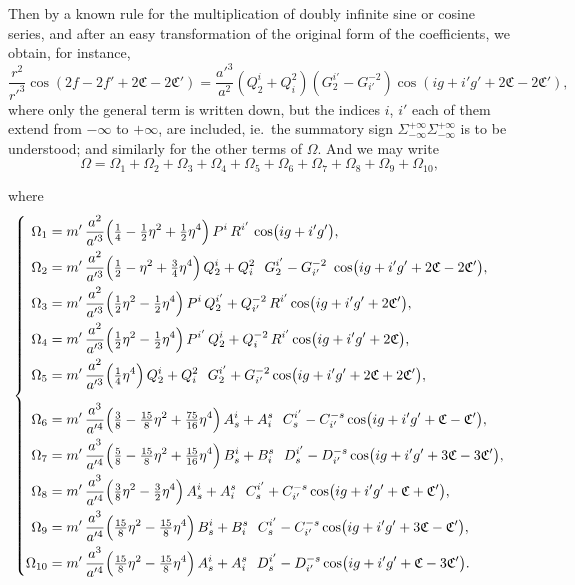 \documentclass[11pt]{article}
\begin{document}
\medskip
\noindent Then by a known rule for the multiplication of doubly infinite sine or cosine series, and after an easy transformation of the original form of the coefficients, we obtain, for instance,
\[
\frac{r^{2}}{r'^{3}}\cos(2f-2f'+2\mathfrak{C}-2\mathfrak{C}') = \frac{a'^{3}}{a^{2}}(Q_{2}^{i}+Q_{i}^{2})(G_{2}^{i'}-G_{i'}^{-2})\cos(ig+i'g'+2\mathfrak{C}-2\mathfrak{C}'),
\]
where only the general term is written down, but the indices $i$, $i'$ each of them extend from $-\infty$ to $+\infty$, are included, ie.\ the summatory sign $\Sigma_{-\infty}^{+\infty}\Sigma_{-\infty}^{+\infty}$ is to be understood; and similarly for the other terms of $\Omega$. And we may write
\[
\Omega = \Omega_{1} + \Omega_{2} + \Omega_{3} + \Omega_{4} + \Omega_{5} + \Omega_{6} + \Omega_{7} + \Omega_{8} + \Omega_{9} + \Omega_{10},
\]

\bigskip
{} where
\[
\left\{
\begin{aligned}
\Omega_{1} &= m'\,\frac{a^{2}}{a'^{3}}\Bigl(\tfrac{1}{4}-\tfrac{1}{2}\eta^{2}+\tfrac{1}{2}\eta^{4}\Bigr)\,P^{i}\,R^{i'}\,\cos\bigl(ig+i'g'\bigr),\\
\Omega_{2} &= m'\,\frac{a^{2}}{a'^{3}}\Bigl(\tfrac{1}{2}-\eta^{2}+\tfrac{3}{4}\eta^{4}\Bigr)\,Q_{2}^{i}+Q_{i}^{2}\ \ G_{2}^{i'}-G_{i'}^{-2}\ \cos\bigl(ig+i'g'+2\mathfrak{C}-2\mathfrak{C}'\bigr),\\
\Omega_{3} &= m'\,\frac{a^{2}}{a'^{3}}\Bigl(\tfrac{1}{2}\eta^{2}-\tfrac{1}{2}\eta^{4}\Bigr)\,P^{i}\,Q_{2}^{i'}+Q_{i'}^{-2}\,R^{i'}\cos\bigl(ig+i'g'+2\mathfrak{C}'\bigr),\\
\Omega_{4} &= m'\,\frac{a^{2}}{a'^{3}}\Bigl(\tfrac{1}{2}\eta^{2}-\tfrac{1}{2}\eta^{4}\Bigr)\,P^{i'}\,Q_{2}^{i}+Q_{i}^{-2}\,R^{i'}\cos\bigl(ig+i'g'+2\mathfrak{C}\bigr),\\
\Omega_{5} &= m'\,\frac{a^{2}}{a'^{3}}\Bigl(\tfrac{1}{4}\eta^{4}\Bigr)\,Q_{2}^{i}+Q_{i}^{2}\ \ G_{2}^{i'}+G_{i'}^{-2}\cos\bigl(ig+i'g'+2\mathfrak{C}+2\mathfrak{C}'\bigr),\\[6pt]
\Omega_{6} &= m'\,\frac{a^{3}}{a'^{4}}\Bigl(\tfrac{3}{8}-\tfrac{15}{8}\eta^{2}+\tfrac{75}{16}\eta^{4}\Bigr)\,A_{s}^{i}+A_{i}^{s}\ \ C_{s}^{i'}-C_{i'}^{-s}\cos\bigl(ig+i'g'+\mathfrak{C}-\mathfrak{C}'\bigr),\\
\Omega_{7} &= m'\,\frac{a^{3}}{a'^{4}}\Bigl(\tfrac{5}{8}-\tfrac{15}{8}\eta^{2}+\tfrac{15}{16}\eta^{4}\Bigr)\,B_{s}^{i}+B_{i}^{s}\ \ D_{s}^{i'}-D_{i'}^{-s}\cos\bigl(ig+i'g'+3\mathfrak{C}-3\mathfrak{C}'\bigr),\\
\Omega_{8} &= m'\,\frac{a^{3}}{a'^{4}}\Bigl(\tfrac{3}{8}\eta^{2}-\tfrac{3}{2}\eta^{4}\Bigr)\,A_{s}^{i}+A_{i}^{s}\ \ C_{s}^{i'}+C_{i'}^{-s}\cos\bigl(ig+i'g'+\mathfrak{C}+\mathfrak{C}'\bigr),\\
\Omega_{9} &= m'\,\frac{a^{3}}{a'^{4}}\Bigl(\tfrac{15}{8}\eta^{2}-\tfrac{15}{8}\eta^{4}\Bigr)\,B_{s}^{i}+B_{i}^{s}\ \ C_{s}^{i'}-C_{i'}^{-s}\cos\bigl(ig+i'g'+3\mathfrak{C}-\mathfrak{C}'\bigr),\\
\Omega_{10} &= m'\,\frac{a^{3}}{a'^{4}}\Bigl(\tfrac{15}{8}\eta^{2}-\tfrac{15}{8}\eta^{4}\Bigr)\,A_{s}^{i}+A_{i}^{s}\ \ D_{s}^{i'}-D_{i'}^{-s}\cos\bigl(ig+i'g'+\mathfrak{C}-3\mathfrak{C}'\bigr).
\end{aligned}
\right.
\]
\end{document}
